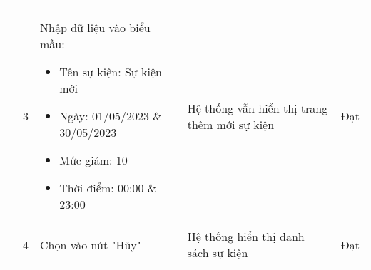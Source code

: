 {\begin{longtable}{| p{2.5cm}| p{1cm}| p{5.5cm}| p{4.5cm} | p{1.5cm} |}
        \cline{2-5}
        & 3 & Nhập dữ liệu vào biểu mẫu:
        \begin{itemize}
            \item Tên sự kiện: Sự kiện mới
            \item Ngày: 01/05/2023 \& 30/05/2023
            \item Mức giảm: 10
            \item Thời điểm: 00:00 \& 23:00 
        \end{itemize} & Hệ thống vẫn hiển thị trang thêm mới sự kiện & Đạt \\
        \cline{2-5}
         & 4 & Chọn vào nút "Hủy" & Hệ thống hiển thị danh sách sự kiện & Đạt \\
        \hline
    \end{longtable} 
}


